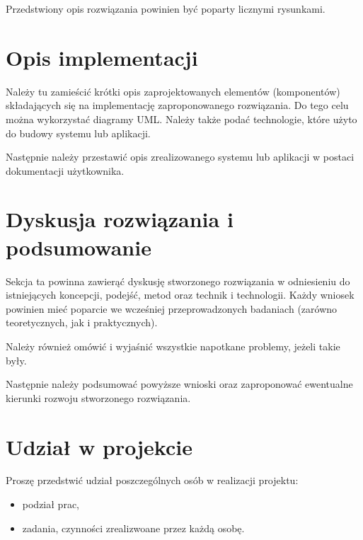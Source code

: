 \documentclass{classrep}
\begin{document}
Przedstwiony opis rozwiązania powinien być poparty licznymi rysunkami.


\section{Opis implementacji}

Należy tu zamieścić krótki opis zaprojektowanych elementów (komponentów) składających się na implementację zaproponowanego rozwiązania. Do tego celu można wykorzystać diagramy UML. Należy także podać technologie, które użyto do budowy systemu lub aplikacji.

Następnie należy przestawić opis zrealizowanego systemu lub aplikacji w postaci dokumentacji użytkownika.


\section{Dyskusja rozwiązania i podsumowanie}

Sekcja ta powinna zawierąć dyskusję stworzonego rozwiązania w odniesieniu do istniejących koncepcji, podejść, metod oraz technik i technologii. Każdy wniosek powinien mieć poparcie we wcześniej przeprowadzonych badaniach (zarówno teoretycznych, jak i praktycznych).

Należy również omówić i wyjaśnić wszystkie napotkane problemy, jeżeli takie były.

Następnie należy podsumować powyższe wnioski oraz zaproponować ewentualne kierunki rozwoju stworzonego rozwiązania.

\section{Udział w projekcie}

Proszę przedstwić udział poszczególnych osób w realizacji projektu: 
\begin{itemize}
\item podział prac,
\item zadania, czynności zrealizwoane przez każdą osobę.
\end{itemize}
\end{document}
